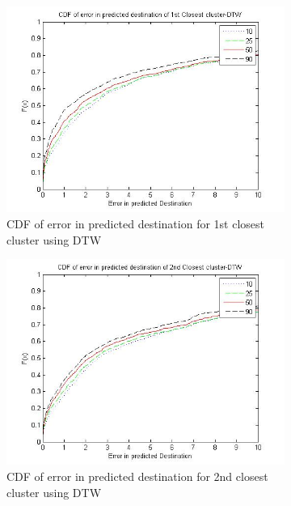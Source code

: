 \begin{figure}
    \centering
    \begin{subfigure}[t]{.5\textwidth}
        \centering
        \includegraphics[scale=0.4]{figs/dtw_top.jpg}
        \caption{CDF of error in predicted destination for 1st closest cluster using DTW}
    \end{subfigure}%
	\begin{subfigure}[t]{.5\textwidth}
        \centering
        \includegraphics[scale=0.4]{figs/dtw_top2.jpg}
        \caption{CDF of error in predicted destination for 2nd closest cluster using DTW}
    \end{subfigure}
    \begin{subfigure}[t]{.5\textwidth}
        \centering

\end{subfigure}
\end{figure}
